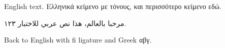 \documentclass{article}
\begin{document}
English text. \textgreek{Ελληνικά κείμενο με τόνους, και περισσότερο κείμενο εδώ.}

\begin{arabic}
مرحبا بالعالم، هذا نص عربي للاختبار ١٢٣.
\end{arabic}

Back to English with fi ligature and Greek \textgreek{αβγ}.
\end{document}
